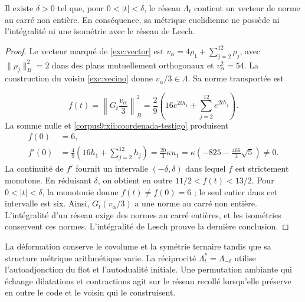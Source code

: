 \begin{proposition}
\label{corpus9:xii:testigo-integralidad}
Il existe \(\delta>0\) tel que, pour \(0<|t|<\delta\), le réseau
\(\Lambda_t\) contient un vecteur de norme au carré non entière.
En conséquence, sa métrique euclidienne ne possède ni l’intégralité ni une
isométrie avec le réseau de Leech.
\end{proposition}
\begin{proof}
Le vecteur marqué de \eqref{exc:vector} est
\(v_\alpha=4\rho_1+\sum_{j=2}^{12}\rho_j\), avec
\(\|\rho_j\|_B^2=2\) dans des plans mutuellement orthogonaux et
\(v_\alpha^2=54\). La construction du voisin
\eqref{exc:vecino} donne \(v_\alpha/3\in\Lambda\). Sa norme transportée est

\begin{equation}
 f(t)=\left\|G_t\frac{v_\alpha}{3}\right\|_B^2
 =\frac29\left(16e^{2th_1}+\sum_{j=2}^{12}e^{2th_j}\right).
 \label{corpus9:xii:norma-testigo}
\end{equation}
La somme nulle et \eqref{corpus9:xii:coordenada-testigo} produisent
\begin{equation}
 \begin{aligned}
 f(0)&=6,\\
 f'(0)&=\frac49\left(16h_1+\sum_{j=2}^{12}h_j\right)
       =\frac{20}{3}\kappa u_1
       =\kappa\left(-825-\frac{466}{3}\sqrt5\right)\ne0.
 \end{aligned}
 \label{corpus9:xii:derivada-testigo}
\end{equation}
La continuité de \(f'\) fournit un intervalle
\((-\delta,\delta)\) dans lequel \(f\) est strictement monotone.
En réduisant \(\delta\), on obtient en outre
\(11/2<f(t)<13/2\). Pour \(0<|t|<\delta\), la monotonie donne
\(f(t)\ne f(0)=6\) ; le seul entier dans cet intervalle est six.
Ainsi, \(G_t(v_\alpha/3)\) a une norme au carré non entière. L’intégralité
d’un réseau exige des normes au carré entières, et les isométries
conservent ces normes. L’intégralité de Leech prouve la dernière
conclusion.
\end{proof}

La déformation conserve le covolume et la symétrie ternaire tandis que
sa structure métrique arithmétique varie. La réciprocité
\(\Lambda_t^*=\Lambda_{-t}\) utilise l’autoadjonction du flot et
l’autodualité initiale. Une permutation ambiante qui échange
dilatations et contractions agit sur le réseau recollé lorsqu’elle
préserve en outre le code et le voisin qui le construisent.


